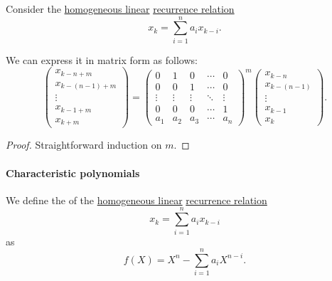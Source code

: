 \begin{proposition}\label{thm:linear_recurrence_relation}
  Consider the \hyperref[def:recurrence_relation/linear]{homogeneous linear} \hyperref[def:recurrence_relation]{recurrence relation}
  \begin{equation*}
    x_k = \sum_{i=1}^n a_i x_{k-i}.
  \end{equation*}

  We can express it in matrix form as follows:
  \begin{equation}\label{eq:thm:linear_recurrence_relation}
    \begin{pmatrix}
      x_{k-n+m}     \\
      x_{k-(n-1)+m} \\
      \vdots        \\
      x_{k-1+m}     \\
      x_{k+m}
    \end{pmatrix}
    =
    \begin{pmatrix}
      0      & 1      & 0      & \cdots & 0      \\
      0      & 0      & 1      & \cdots & 0      \\
      \vdots & \vdots & \vdots & \ddots & \vdots \\
      0      & 0      & 0      & \cdots & 1      \\
      a_1    & a_2    & a_3    & \cdots & a_n
    \end{pmatrix}^m
    \begin{pmatrix}
      x_{k-n}     \\
      x_{k-(n-1)} \\
      \vdots      \\
      x_{k-1}     \\
      x_k
    \end{pmatrix}.
  \end{equation}
\end{proposition}
\begin{proof}
  Straightforward induction on \( m \).
\end{proof}

\paragraph{Characteristic polynomials}

\begin{definition}\label{def:characteristic_polynomial_of_linear_recurrence}
  We define the  of the \hyperref[def:recurrence_relation/linear]{homogeneous linear} \hyperref[def:recurrence_relation]{recurrence relation}
  \begin{equation*}
    x_k = \sum_{i=1}^n a_i x_{k-i}
  \end{equation*}
  as
  \begin{equation}\label{eq:def:characteristic_polynomial_of_linear_recurrence}
    f(X) = X^n - \sum_{i=1}^n a_i X^{n-i}.
  \end{equation}
\end{definition}

